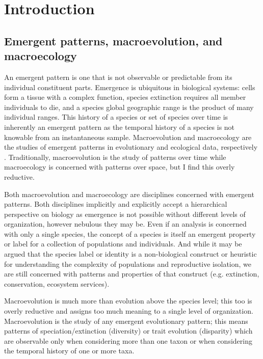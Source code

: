 \chapter{Introduction}

\section{Emergent patterns, macroevolution, and macroecology}



An emergent pattern is one that is not observable or predictable from its individual constituent parts. Emergence is ubiquitous in biological systems: cells form a tissue with a complex function, species extinction requires all member individuals to die, and a species global geographic range is the product of many individual ranges. This history of a species or set of species over time is inherently an emergent pattern as the temporal history of a species is not knowable from an instantaneous sample. Macroevolution and macroecology are the studies of emergent patterns in evolutionary and ecological data, respectively \citep{Brown1989,Brown1995,Stanley1979,Stanley1975}. Traditionally, macroevolution is the study of patterns over time while macroecology is concerned with patterns over space, but I find this overly reductive.

Both macroevolution and macroecology are disciplines concerned with emergent patterns. Both disciplines implicitly and explicitly accept a hierarchical perspective on biology as emergence is not possible without different levels of organization, however nebulous they may be. Even if an analysis is concerned with only a single species, the concept of a species is itself an emergent property or label for a collection of populations and individuals. And while it may be argued that the species label or identity is a non-biological construct or heuristic for understanding the complexity of populations and reproductive isolation, we are still concerned with patterns and properties of that construct (e.g. extinction, conservation, ecosystem services).

Macroevolution is much more than evolution above the species level; this too is overly reductive and assigns too much meaning to a single level of organization. Macroevolution is the study of any emergent evolutionary pattern; this means patterns of speciation/extinction (diversity) or trait evolution (disparity) which are observable only when considering more than one taxon or when considering the temporal history of one or more taxa.

